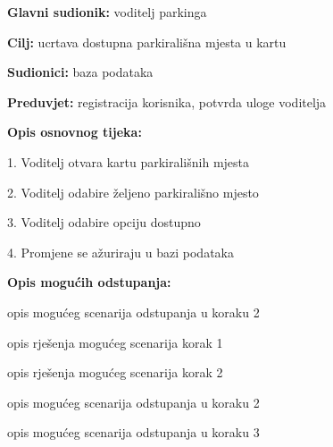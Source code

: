 					\noindent {}
					\begin{packed_item}
						
						\item \textbf{Glavni sudionik: }voditelj parkinga
						\item  \textbf{Cilj:} ucrtava dostupna parkirališna mjesta u kartu
						\item  \textbf{Sudionici:} baza podataka
						\item  \textbf{Preduvjet:} registracija korisnika, potvrda uloge voditelja
						\item  \textbf{Opis osnovnog tijeka:}
						
						\item[] \begin{packed_enum}
							
							\item 1. Voditelj otvara kartu parkirališnih mjesta
							\item 2. Voditelj odabire željeno parkirališno mjesto
							\item 3. Voditelj odabire opciju dostupno
							\item 4. Promjene se ažuriraju u bazi podataka
						\end{packed_enum}
						
						\item  \textbf{Opis mogućih odstupanja:}
						
						\item[] \begin{packed_item}
							
							\item[2.a] opis mogućeg scenarija odstupanja u koraku 2
							\item[] \begin{packed_enum}
								
								\item opis rješenja mogućeg scenarija korak 1
								\item opis rješenja mogućeg scenarija korak 2
								
							\end{packed_enum}
							\item[2.b] opis mogućeg scenarija odstupanja u koraku 2
							\item[3.a] opis mogućeg scenarija odstupanja  u koraku 3
							
						\end{packed_item}
					\end{packed_item}
					
